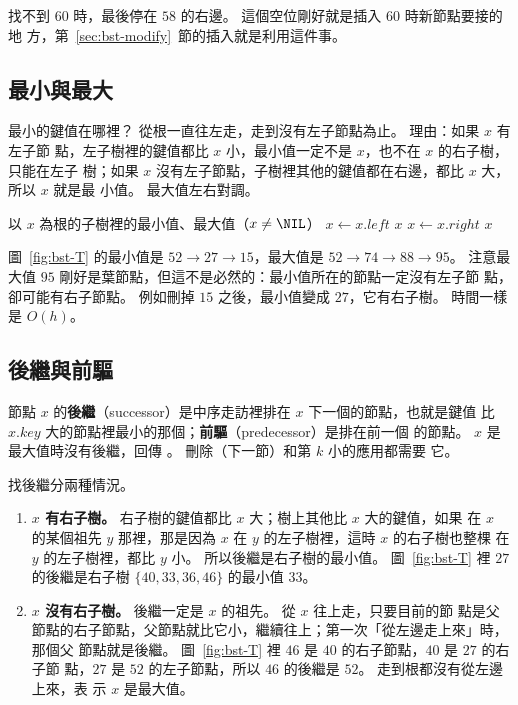 找不到 $60$ 時，最後停在 $58$ 的右邊。 這個空位剛好就是插入 $60$ 時新節點要接的地
方，第~\ref{sec:bst-modify}~節的插入就是利用這件事。

\subsection{最小與最大}

最小的鍵值在哪裡？ 從根一直往左走，走到沒有左子節點為止。 理由：如果 $x$ 有左子節
點，左子樹裡的鍵值都比 $x$ 小，最小值一定不是 $x$，也不在 $x$ 的右子樹，只能在左子
樹；如果 $x$ 沒有左子節點，子樹裡其他的鍵值都在右邊，都比 $x$ 大，所以 $x$ 就是最
小值。 最大值左右對調。

\begin{pseudo}[label=alg:bst-minmax]{以 $x$ 為根的子樹裡的最小值、最大值（$x \ne \NIL$）}
        \State $x \gets x.\mathit{left}$
    \EndWhile
    \State \Return $x$
\EndFunction
{}
        \State $x \gets x.\mathit{right}$
    \EndWhile
    \State \Return $x$
\EndFunction
\end{pseudo}

圖~\ref{fig:bst-T} 的最小值是 $52 \to 27 \to 15$，最大值是 $52 \to 74 \to 88 \to
95$。 注意最大值 $95$ 剛好是葉節點，但這不是必然的：最小值所在的節點一定沒有左子節
點，卻可能有右子節點。 例如刪掉 $15$ 之後，最小值變成 $27$，它有右子樹。 時間一樣
是 $O(h)$。

\subsection{後繼與前驅}

節點 $x$ 的\textbf{後繼}（successor）是中序走訪裡排在 $x$ 下一個的節點，也就是鍵值
比 $x.\mathit{key}$ 大的節點裡最小的那個；\textbf{前驅}（predecessor）是排在前一個
的節點。 $x$ 是最大值時沒有後繼，回傳 \NIL。 刪除（下一節）和第 $k$ 小的應用都需要
它。

找後繼分兩種情況。

\begin{enumerate}
\item \textbf{$x$ 有右子樹。} 右子樹的鍵值都比 $x$ 大；樹上其他比 $x$ 大的鍵值，如果
在 $x$ 的某個祖先 $y$ 那裡，那是因為 $x$ 在 $y$ 的左子樹裡，這時 $x$ 的右子樹也整棵
在 $y$ 的左子樹裡，都比 $y$ 小。 所以後繼是右子樹的最小值。 圖~\ref{fig:bst-T} 裡
$27$ 的後繼是右子樹 $\{40, 33, 36, 46\}$ 的最小值 $33$。
\item \textbf{$x$ 沒有右子樹。} 後繼一定是 $x$ 的祖先。 從 $x$ 往上走，只要目前的節
點是父節點的右子節點，父節點就比它小，繼續往上；第一次「從左邊走上來」時，那個父
節點就是後繼。 圖~\ref{fig:bst-T} 裡 $46$ 是 $40$ 的右子節點，$40$ 是 $27$ 的右子節
點，$27$ 是 $52$ 的左子節點，所以 $46$ 的後繼是 $52$。 走到根都沒有從左邊上來，表
示 $x$ 是最大值。
\end{enumerate}

